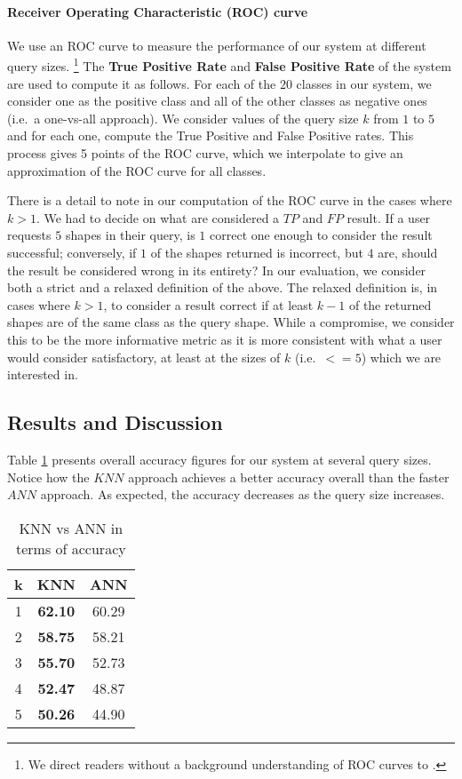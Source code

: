 \paragraph{Receiver Operating Characteristic (ROC) curve}
We use an ROC curve to measure the performance of our system at different query sizes. \footnote{We direct readers without a background understanding of ROC curves to \cite{fawcett2006introduction}.}  %
The \textbf{True Positive Rate} and \textbf{False Positive Rate} of the system are used to compute it as follows.
For each of the $20$ classes in our system, we consider one as the positive class and all of the other classes as negative ones (i.e.\ a one-vs-all approach).
We consider values of the query size $k$ from $1$ to $5$ and for each one, compute the True Positive and False Positive rates.
This process gives 5 points of the ROC curve, which we interpolate to give an approximation of the ROC curve for all classes.

There is a detail to note in our computation of the ROC curve in the cases where $k>1$.
We had to decide on what are considered a $TP$ and $FP$ result.
If a user requests $5$ shapes in their query, is $1$ correct one enough to consider the result successful;
conversely, if $1$ of the shapes returned is incorrect, but $4$ are, should the result be considered wrong in its entirety?
In our evaluation, we consider both a strict and a relaxed definition of the above.
The relaxed definition is, in cases where $k>1$, to consider a result correct if at least $k-1$ of the returned shapes are of the same class as the query shape.
While a compromise, we consider this to be the more informative metric as it is more consistent with what a user would consider satisfactory, at least at the sizes of $k$ (i.e.\ $<=5$) which we are interested in.

\subsection{Results and Discussion}
Table \ref{tab:accuracy} presents overall accuracy figures for our system at several query sizes.
Notice how the $KNN$ approach achieves a better accuracy overall than the faster $ANN$ approach.
As expected, the accuracy decreases as the query size increases.
 
\begin{table}[ht]
    \centering
    \begin{tabular}{c|c|c}
        \textbf{k} & \textbf{KNN} & \textbf{ANN} \\
        \hline
        1 & \textbf{62.10} & 60.29\\
        2 & \textbf{58.75} & 58.21\\
        3 & \textbf{55.70} & 52.73\\
        4 & \textbf{52.47} & 48.87\\
        5 & \textbf{50.26} & 44.90\\
    \end{tabular}
    \caption{KNN vs ANN in terms of accuracy}
    \label{tab:accuracy}
\end{table}

